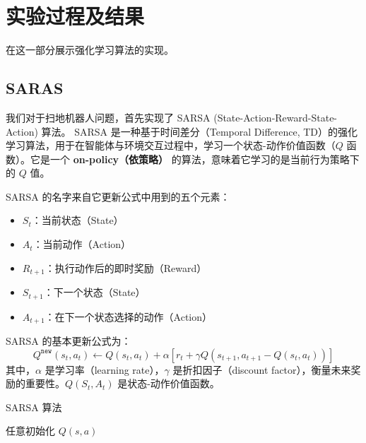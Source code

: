 \documentclass[citestyle=gb7714-2015, bibstyle=gb7714-2015,lang=cn,14pt,scheme=chinese]{elegantbook}
\begin{document}
\chapter{实验过程及结果}

在这一部分展示强化学习算法的实现。

\section{SARAS}

我们对于扫地机器人问题，首先实现了 SARSA (State-Action-Reward-State-Action) 算法。
SARSA 是一种基于时间差分（Temporal Difference, TD）的强化学习算法，用于在智能体与环境交互过程中，学习一个状态-动作价值函数（\(Q\) 函数）。它是一个 \textbf{on-policy（依策略）} 的算法，意味着它学习的是当前行为策略下的 \(Q\) 值。

SARSA 的名字来自它更新公式中用到的五个元素：
\begin{itemize}
    \item \(S_t\)：当前状态（State）
    \item \(A_t\)：当前动作（Action）
    \item \(R_{t+1}\)：执行动作后的即时奖励（Reward）
    \item \(S_{t+1}\)：下一个状态（State）
    \item \(A_{t+1}\)：在下一个状态选择的动作（Action）
\end{itemize}

SARSA 的基本更新公式为：
\[
    Q^{\texttt{new}} \left( s_t, a_t \right) \leftarrow  Q \left( s_t, a_t \right) + \alpha \left[ r_{t} + \gamma Q \left( s_{t+1}, a_{t+1} - Q \left( s_t, a_t \right) \right) \right]
\]
其中，\(\alpha\) 是学习率（learning rate），\(\gamma\) 是折扣因子（discount factor），衡量未来奖励的重要性。\(Q \left( S_t, A_t \right)\) 是状态-动作价值函数。

\begin{algorithm}[H]
\caption{SARSA 算法}

任意初始化 \(Q(s,a)\)\;

\end{algorithm}
\end{document}
